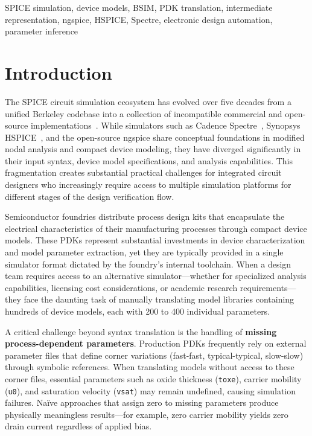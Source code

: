 \documentclass[conference]{IEEEtran}
\begin{document}
\begin{IEEEkeywords}
SPICE simulation, device models, BSIM, PDK translation, intermediate representation, ngspice, HSPICE, Spectre, electronic design automation, parameter inference
\end{IEEEkeywords}

\section{Introduction}

The SPICE circuit simulation ecosystem has evolved over five decades from a unified Berkeley codebase into a collection of incompatible commercial and open-source implementations~\cite{ngspice}. While simulators such as Cadence Spectre~\cite{spectre}, Synopsys HSPICE~\cite{hspice}, and the open-source ngspice share conceptual foundations in modified nodal analysis and compact device modeling, they have diverged significantly in their input syntax, device model specifications, and analysis capabilities. This fragmentation creates substantial practical challenges for integrated circuit designers who increasingly require access to multiple simulation platforms for different stages of the design verification flow.

Semiconductor foundries distribute process design kits that encapsulate the electrical characteristics of their manufacturing processes through compact device models. These PDKs represent substantial investments in device characterization and model parameter extraction, yet they are typically provided in a single simulator format dictated by the foundry's internal toolchain. When a design team requires access to an alternative simulator---whether for specialized analysis capabilities, licensing cost considerations, or academic research requirements---they face the daunting task of manually translating model libraries containing hundreds of device models, each with 200 to 400 individual parameters.

A critical challenge beyond syntax translation is the handling of \textbf{missing process-dependent parameters}. Production PDKs frequently rely on external parameter files that define corner variations (fast-fast, typical-typical, slow-slow) through symbolic references. When translating models without access to these corner files, essential parameters such as oxide thickness (\texttt{toxe}), carrier mobility (\texttt{u0}), and saturation velocity (\texttt{vsat}) may remain undefined, causing simulation failures. Na\"ive approaches that assign zero to missing parameters produce physically meaningless results---for example, zero carrier mobility yields zero drain current regardless of applied bias.
\end{document}
